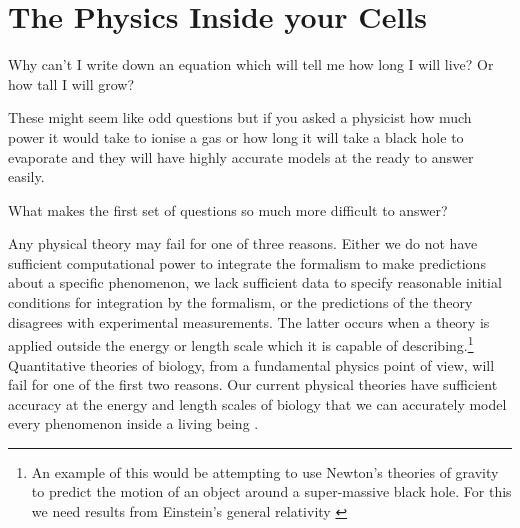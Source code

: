 

\section{The Physics Inside your Cells}

Why can't I write down an equation which will tell me how long I will live? Or how tall I will grow?

These might seem like odd questions but if you asked a physicist how much power it would take to ionise a gas or how long it will take a black hole to evaporate and they will have highly accurate models at the ready to answer easily. 

What makes the first set of questions so much more difficult to answer?

Any physical theory may fail for one of three reasons. Either we do not have sufficient computational power to integrate the formalism to make predictions about a specific phenomenon, we lack sufficient data to specify reasonable initial conditions for integration by the formalism, or the predictions of the theory disagrees with experimental measurements. The latter occurs when a theory is applied outside the energy or length scale which it is capable of describing.\footnote{An example of this would be attempting to use Newton's theories of gravity to predict the motion of an object around a super-massive black hole. For this we need results from Einstein's general relativity \cite{picker2022}} Quantitative theories of biology, from a fundamental physics point of view, will fail for one of the first two reasons. Our current physical theories have sufficient accuracy at the energy and length scales of biology that we can accurately model every phenomenon inside a living being \cite{carroll2021}. 

